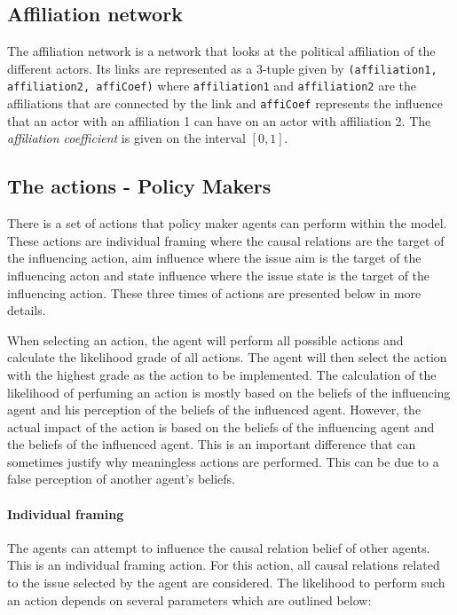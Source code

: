 \subsection{Affiliation network}

The affiliation network is a network that looks at the political affiliation of the different actors. Its links are represented as a 3-tuple given by \texttt{(affiliation1, affiliation2, affiCoef)} where \texttt{affiliation1} and \texttt{affiliation2} are the affiliations that are connected by the link and \texttt{affiCoef} represents the influence that an actor with an affiliation 1 can have on an actor with affiliation 2. The \emph{affiliation coefficient} is given on the interval $[0,1]$.

\subsection{The actions - Policy Makers}

There is a set of actions that policy maker agents can perform within the model. These actions are individual framing where the causal relations are the target of the influencing action, aim influence where the issue aim is the target of the influencing acton and state influence where the issue state is the target of the influencing action. These three times of actions are presented below in more details.

When selecting an action, the agent will perform all possible actions and calculate the likelihood grade of all actions. The agent will then select the action with the highest grade as the action to be implemented. The calculation of the likelihood of perfuming an action is mostly based on the beliefs of the influencing agent and his perception of the beliefs of the influenced agent. However, the actual impact of the action is based on the beliefs of the influencing agent and the beliefs of the influenced agent. This is an important difference that can sometimes justify why meaningless actions are performed. This can be due to a false perception of another agent’s beliefs.

\paragraph{Individual framing}

The agents can attempt to influence the causal relation belief of other agents. This is an individual framing action. For this action, all causal relations related to the issue selected by the agent are considered. The likelihood to perform such an action depends on several parameters which are outlined below:

